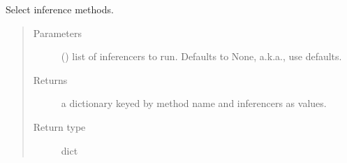 \documentclass[letterpaper,10pt,english]{sphinxmanual}
\begin{document}
\begin{fulllineitems}
\label{\detokenize{_modules/cosifer.pipelines:cosifer.pipelines.pipeline_cli.method_selection}}
Select inference methods.
\begin{quote}\begin{description}
\item[{Parameters}] \leavevmode
{} () \textendash{} list of inferencers to run. Defaults to None,
a.k.a., use defaults.

\item[{Returns}] \leavevmode
a dictionary keyed by method name and inferencers as values.

\item[{Return type}] \leavevmode
dict

\end{description}\end{quote}

\end{fulllineitems}

\end{document}
